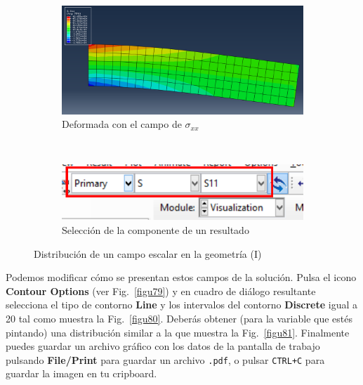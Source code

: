 \begin{enumerate}
\begin{figure}[H]
\begin{subfigure}{0.44\textwidth}
      \includegraphics[width=\textwidth]{./body/images/imagen77}
      \caption{Deformada con el campo de $\sigma_{xx}$}
      \label{figu77}
    \end{subfigure}%
    ~ %
    \begin{subfigure}{0.35\textwidth}
      \includegraphics[width=\textwidth]{./body/images/imagen78.pdf}
      \caption{Selección de la componente de un resultado}
      \label{figu78}
    \end{subfigure}%
    \caption{Distribución de un campo escalar en la geometría (I)}
  \end{figure}

  Podemos modificar cómo se presentan estos campos de la
  solución. Pulsa el icono \textbf{Contour Options} (ver
  Fig.~\ref{figu79}) y en cuadro de diálogo resultante selecciona el
  tipo de contorno \textbf{Line} y los intervalos del contorno
  \textbf{Discrete} igual a 20 tal como muestra la
  Fig.~\ref{figu80}. Deberás obtener (para la variable que estés
  pintando) una distribución similar a la que muestra la
  Fig.~\ref{figu81}. Finalmente puedes guardar un archivo gráfico con
  los datos de la pantalla de trabajo pulsando \textbf{File/Print}
  para guardar un archivo \texttt{.pdf}, o pulsar \texttt{CTRL+C} para
  guardar la imagen en tu cripboard.


\end{enumerate}
